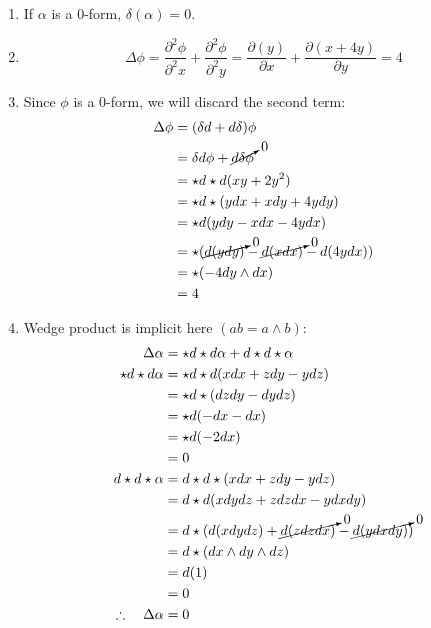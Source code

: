 \documentclass{article}
\begin{document}
\begin{enumerate}[label=(\alph*)]
    \item If $\alpha$ is a 0-form, $\delta(\alpha) = 0$.
    \item 
    $$
        \Delta\phi = \frac{\partial^2\phi}{\partial^2x} + \frac{\partial^2\phi}{\partial^2y}
            = \frac{\partial(y)}{\partial x} + \frac{\partial(x + 4y)}{\partial y} = 4
    $$
    \item Since $\phi$ is a 0-form, we will discard the second term:
    \begin{align} 
        \Delta\phi &= (\delta d + d\delta)\phi \notag\\
            &= \delta d\phi + \cancelto{0}{d\delta\phi} \notag\\
            &= \star d \star d(xy+2y^2) \notag\\
            &= \star d \star(ydx + xdy + 4ydy) \notag\\
            &= \star d(ydy - xdx - 4ydx) \notag\\
            &= \star (\cancelto{0}{d(ydy)} - \cancelto{0}{d(xdx)} - d(4ydx)) \notag\\
            &= \star (-4dy\wedge dx) \notag\\
            &= 4 \notag
    \end{align}

    \item Wedge product is implicit here $(ab = a \wedge b)$:
    \begin{align} 
        \Delta\alpha &= \star d\star d\alpha + d\star d \star\alpha \notag\\
        \star d\star d\alpha &= \star d\star d(xdx + zdy - ydz) \notag\\
            &= \star d\star (dzdy - dydz) \notag\\
            &= \star d (-dx-dx) \notag\\
            &= \star d (-2dx) \notag\\
            &= 0 \notag\\
        d\star d \star\alpha &=  d\star d \star(xdx + zdy - ydz) \notag\\
            &= d\star d(xdydz + zdzdx - ydxdy) \notag\\
            &= d\star (d(xdydz) + \cancelto{0}{d(zdzdx)} - \cancelto{0}{d(ydxdy)}) \notag\\
            &= d\star (dx \wedge dy \wedge dz) \notag\\
            &= d (1) \notag\\
            &= 0 \notag\\
        \therefore \quad \Delta\alpha &= 0 \notag
    \end{align}
\end{enumerate}
\end{document}
